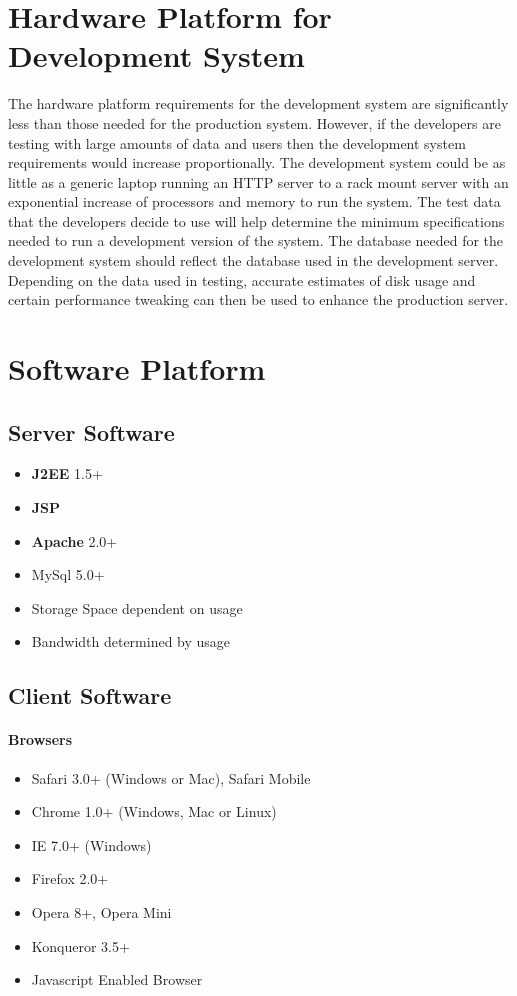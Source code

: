 \documentclass[letterpaper,12pt]{report}
\begin{document}
\section{Hardware Platform for Development System}
The hardware platform requirements for the development system are significantly less than those needed for the production system. However, if the developers are testing with large amounts of data and users then the development system requirements would increase proportionally. The development system could be as little as a generic laptop running an HTTP server to a rack mount server with an exponential increase of processors and memory to run the system. The test data that the developers decide to use will help determine the minimum specifications needed to run a development version of the system.
The database needed for the development system should reflect the database used in the development server. Depending on the data used in testing, accurate estimates of disk usage and certain performance tweaking can then be used to enhance the production server.

\pagebreak
\section{Software Platform}
\subsection{Server Software}
\begin{itemize}
 \item \textbf{J2EE} 1.5+ 
 \item \textbf{JSP} 
 \item \textbf{Apache} 2.0+
 \item MySql 5.0+ 
 \item Storage Space dependent on usage
 \item Bandwidth determined by usage
\end{itemize}

\subsection{Client Software}
\paragraph{Browsers}
\begin{itemize}
 \item Safari 3.0+ (Windows or Mac), Safari Mobile
 \item Chrome 1.0+ (Windows, Mac or Linux)
 \item IE 7.0+ (Windows)
 \item Firefox 2.0+
 \item Opera 8+, Opera Mini
 \item Konqueror 3.5+
 \item Javascript Enabled Browser
\end{itemize}
\end{document}
